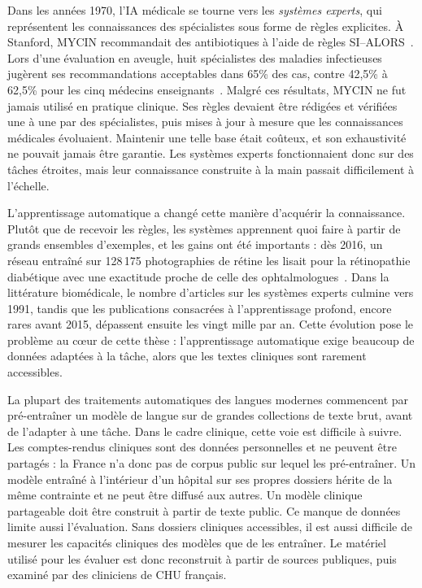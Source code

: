 Dans les années 1970, l'IA médicale se tourne vers les \textit{systèmes experts},
qui représentent les connaissances des spécialistes sous forme de règles explicites.
À Stanford, MYCIN recommandait des antibiotiques à l'aide de règles
SI--ALORS~\citep{mycin_1975}. Lors d'une évaluation en aveugle, huit spécialistes des
maladies infectieuses jugèrent ses recommandations acceptables dans 65\% des cas,
contre 42,5\% à 62,5\% pour les cinq médecins enseignants~\citep{mycin_eval_1979}. Malgré ces
résultats, MYCIN ne fut jamais utilisé en pratique clinique. Ses règles devaient être
rédigées et vérifiées une à une par des spécialistes, puis mises à jour à mesure que
les connaissances médicales évoluaient. Maintenir une telle base était coûteux, et son
exhaustivité ne pouvait jamais être garantie. Les systèmes experts fonctionnaient donc
sur des tâches étroites, mais leur connaissance construite à la main passait
difficilement à l'échelle.

L'apprentissage automatique a changé cette manière d'acquérir la connaissance.
Plutôt que de recevoir les règles, les systèmes apprennent quoi faire à
partir de grands ensembles d'exemples, et les gains ont été importants : dès 2016, un
réseau entraîné sur 128\,175 photographies de rétine les lisait pour la rétinopathie
diabétique avec une exactitude proche de celle des ophtalmologues~\citep{gulshan_2016}.
Dans la littérature biomédicale, le nombre d'articles sur les systèmes experts
culmine vers 1991, tandis que les publications consacrées à l'apprentissage profond,
encore rares avant 2015, dépassent ensuite les vingt mille par an. Cette évolution
pose le problème au cœur de cette thèse : l'apprentissage automatique exige beaucoup
de données adaptées à la tâche, alors que les textes cliniques sont rarement
accessibles.

La plupart des traitements automatiques des langues modernes commencent par
pré-entraîner un modèle de langue sur de grandes collections de texte brut, avant de
l'adapter à une tâche. Dans le cadre clinique, cette voie est difficile à suivre. Les
comptes-rendus cliniques sont des données personnelles et ne peuvent être partagés :
la France n'a donc pas de corpus public sur lequel les pré-entraîner. Un modèle
entraîné à l'intérieur d'un hôpital sur ses propres dossiers hérite de la même
contrainte et ne peut être diffusé aux autres. Un modèle clinique partageable doit
être construit à partir de texte public. Ce manque de données limite aussi
l'évaluation. Sans dossiers cliniques accessibles, il est aussi difficile de mesurer
les capacités cliniques des modèles que de les entraîner. Le matériel utilisé pour
les évaluer est donc reconstruit à partir de sources publiques, puis examiné par des
cliniciens de CHU français.

